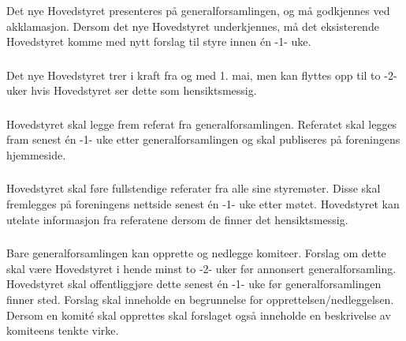 \subsubsection{}
Det nye Hovedstyret presenteres på generalforsamlingen, og må godkjennes ved
akklamasjon. Dersom det nye Hovedstyret underkjennes, må det eksisterende
Hovedstyret komme med nytt forslag til styre innen én -1- uke.

\subsubsection{}
Det nye Hovedstyret trer i kraft fra og med 1. mai, men kan flyttes opp til to
-2- uker hvis Hovedstyret ser dette som hensiktsmessig.

\subsubsection{}
Hovedstyret skal legge frem referat fra generalforsamlingen. Referatet skal
legges fram senest én -1- uke etter generalforsamlingen og skal publiseres på
foreningens hjemmeside.

\subsubsection{}
Hovedstyret skal føre fullstendige referater fra alle sine styremøter. Disse
skal fremlegges på foreningens nettside senest én -1- uke etter møtet.
Hovedstyret kan utelate informasjon fra referatene dersom de finner det
hensiktsmessig.

\subsubsection{}
Bare generalforsamlingen kan opprette og nedlegge komiteer. Forslag om dette
skal være Hovedstyret i hende minst to -2- uker før annonsert
generalforsamling. Hovedstyret skal offentliggjøre dette senest én -1- uke før
generalforsamlingen finner sted. Forslag skal inneholde en begrunnelse for
opprettelsen/nedleggelsen. Dersom en komité skal opprettes skal forslaget også
inneholde en beskrivelse av komiteens tenkte virke.
